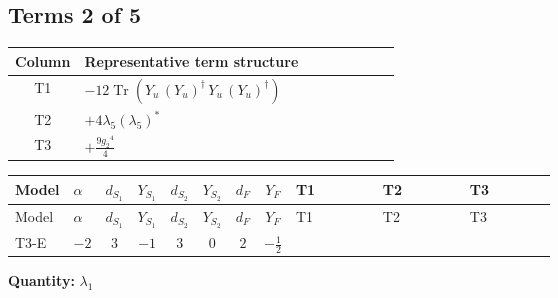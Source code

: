 \documentclass[8pt]{article}
\begin{document}
\begin{landscape}
\subsection*{Terms 2 of 5}
\begin{center}
\begin{tabular}{@{}c >{\raggedright\arraybackslash}p{0.82\linewidth}@{}}
\toprule
Column & Representative term structure \\
\midrule
T1 & \(\displaystyle -12 \operatorname{Tr}\!\left({Y_u}\,\left({Y_u}\right)^{\dagger}\,{Y_u}\,\left({Y_u}\right)^{\dagger}\right)\) \\
\midrule
T2 & \(\displaystyle +4 {\lambda_5} \left({\lambda_5}\right)^{*}\) \\
\midrule
T3 & \(\displaystyle +\frac{9 {g_2}^4}{4}\) \\
\midrule
\bottomrule
\end{tabular}
\end{center}
\smallskip
\tiny
\begin{longtable}{@{}llcccccc >{\raggedright\arraybackslash}p{0.21\linewidth} >{\raggedright\arraybackslash}p{0.21\linewidth} >{\raggedright\arraybackslash}p{0.21\linewidth}@{}}
\toprule
Model & $\alpha$ & $d_{S_1}$ & $Y_{S_1}$ & $d_{S_2}$ & $Y_{S_2}$ & $d_F$ & $Y_F$ & T1 & T2 & T3 \\
\midrule
\endfirsthead
\toprule
Model & $\alpha$ & $d_{S_1}$ & $Y_{S_1}$ & $d_{S_2}$ & $Y_{S_2}$ & $d_F$ & $Y_F$ & T1 & T2 & T3 \\
\midrule
\endhead
T3-E & $-2$ & $3$ & $-1$ & $3$ & $0$ & $2$ & $-\frac{1}{2}$ & \scriptsize\adjustbox{max width=\linewidth}{$\begin{gathered} -12 \operatorname{Tr}\!\left({Y_u}\,\left({Y_u}\right)^{\dagger}\,{Y_u}\,\left({Y_u}\right)^{\dagger}\right)\end{gathered}$} & \scriptsize\adjustbox{max width=\linewidth}{$\begin{gathered} +4 {\lambda_5} \left({\lambda_5}\right)^{*}\end{gathered}$} & \scriptsize\adjustbox{max width=\linewidth}{$\begin{gathered} +\frac{9 {g_2}^4}{4}\end{gathered}$} \\
\midrule
\bottomrule
\end{longtable}
\clearpage
\noindent\textbf{Quantity: }$\lambda_1$\par\smallskip

\end{landscape}
\end{document}
